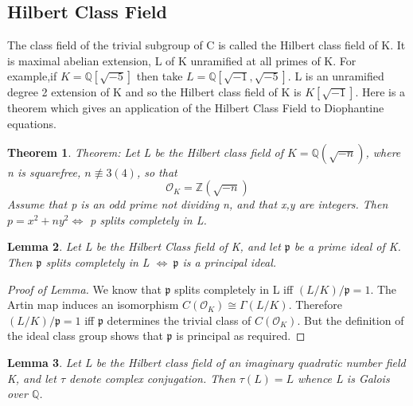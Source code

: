 \documentclass[preprint,12pt,reqno]{elsarticle}
\newtheorem{theorem}{Theorem}
\newtheorem{lemma}[theorem]{Lemma}
\begin{document}
\subsection{Hilbert Class Field}
The class field of the trivial subgroup of C is called the Hilbert class field of K. It is maximal abelian extension, L of K unramified at all primes of K.
\newline
For example,if $K=\mathbb{Q}[\sqrt{-5}]$ then take $L=\mathbb{Q}[\sqrt{-1},\sqrt{-5}]$. L is an unramified degree 2 extension of K and so the Hilbert class field of K is $K[\sqrt{-1}]$. Here is a theorem which gives an application of the Hilbert Class Field to Diophantine equations.
\newline

\begin{theorem}
Theorem: Let L be the Hilbert class field of $K=\mathbb{Q}(\sqrt{-n})$, where n is squarefree, $n\not\equiv 3(4)$, so that
\begin{equation}
    \mathcal{O}_K=\mathbb{Z}(\sqrt{-n})
\end{equation}
Assume that p is an odd prime not dividing n, and that x,y are integers. Then 
$p=x^2+ny^2 \Longleftrightarrow$ p splits completely in L.
\end{theorem}
\begin{lemma}
Let L be the Hilbert Class field of K, and let $\mathfrak{p}$ be a prime ideal of K. Then \newline $\mathfrak{p}$ splits completely in L $\Longleftrightarrow\:\mathfrak{p}$ is a principal ideal.
\end{lemma}
\begin{proof}[Proof of Lemma]
We know that $\mathfrak{p}$ splits completely in L iff $(L/K)/\mathfrak{p}=1$. The Artin map induces an isomorphism $C(\mathcal{O}_K)\cong\Gamma(L/K)$. Therefore $(L/K)/\mathfrak{p}=1$ iff $\mathfrak{p}$ determines the trivial class of $C(\mathcal{O}_K)$. But the definition of the ideal class group shows that $\mathfrak{p}$ is principal as required.
\end{proof}
\begin{lemma}
Let L be the Hilbert class field of an imaginary quadratic number field K, and let $\tau$ denote complex conjugation. Then $\tau(L)=L$ whence L is Galois over $\mathbb{Q}$.
\end{lemma}
\end{document}
